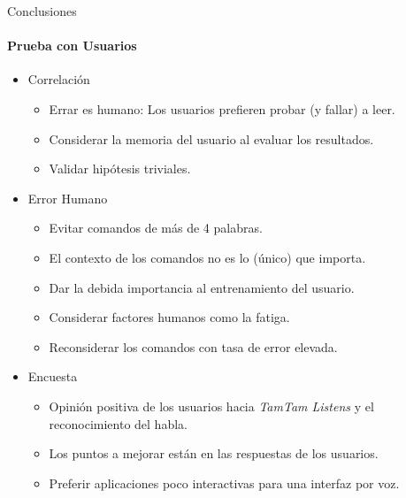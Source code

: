 \begin{frame}{Conclusiones}
\framesubtitle{Prueba con Usuarios}

\begin{itemize}
    \item Correlación
        \begin{itemize}
            \item Errar es humano: Los usuarios prefieren probar (y fallar) a leer.
            \item Considerar la memoria del usuario al evaluar los resultados.
            \item Validar hip\'otesis triviales.
        \end{itemize}
    \item Error Humano
        \begin{itemize}
            \item Evitar comandos de m\'as de 4 palabras.
            \item El contexto de los comandos no es lo (\'unico) que importa.
            \item Dar la debida importancia al entrenamiento del usuario.
            \item Considerar factores humanos como la fatiga.
            \item Reconsiderar los comandos con tasa de error elevada.
        \end{itemize}
    \item Encuesta
        \begin{itemize}
            \item Opini\'on positiva de los usuarios hacia \emph{TamTam Listens} y el reconocimiento del habla.
            \item Los puntos a mejorar est\'an en las respuestas de los usuarios.
            \item Preferir aplicaciones poco interactivas para una interfaz por voz.
        \end{itemize}
    \end{itemize}

\end{frame}